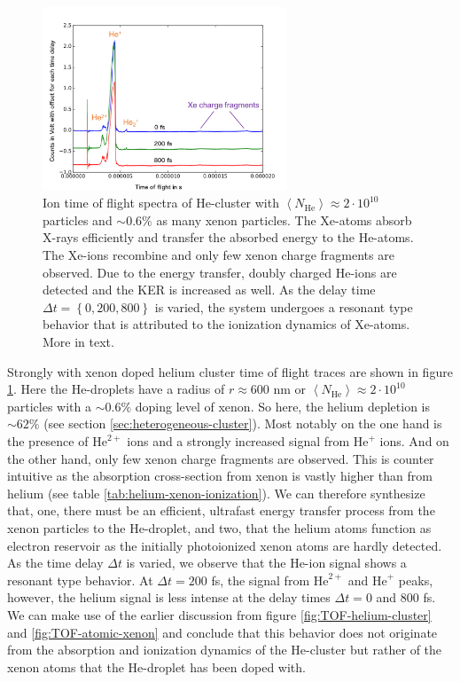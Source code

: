 \begin{figure}
	\centering
		\includegraphics[width=0.65\textwidth]{images/results/TOF-helium-xenon-cluster-60.png}
	\caption{Ion time of flight spectra of He-cluster with $\left\langle N_{\text{He}}\right\rangle\approx 2\cdot 10^{10}$ particles and $\sim 0.6\%$ as many xenon particles. The Xe-atoms absorb X-rays efficiently and transfer the absorbed energy to the He-atoms. The Xe-ions recombine and only few xenon charge fragments are observed. Due to the energy transfer, doubly charged He-ions are detected and the KER is increased as well. As the delay time $\Delta t=\left\{0,200,800\right\}$ is varied, the system undergoes a resonant type behavior that is attributed to the ionization dynamics of Xe-atoms. More in text.}
	\label{fig:TOF-helium-xenon-cluster-60}
\end{figure}
Strongly with xenon doped helium cluster time of flight traces are shown in figure \ref{fig:TOF-helium-xenon-cluster-60}. Here the He-droplets have a radius of $r\approx 600$ nm or $\left\langle N_{\text{He}}\right\rangle\approx 2\cdot 10^{10}$ particles with a $\sim 0.6\%$ doping level of xenon. So here, the helium depletion is $\sim 62\%$ (see section \ref{sec:heterogeneous-cluster}). Most notably on the one hand is the presence of $\text{He}^{2+}$ ions and a strongly increased signal from $\text{He}^{+}$ ions. And on the other hand, only few xenon charge fragments are observed. This is counter intuitive as the absorption cross-section from xenon is vastly higher than from helium (see table \ref{tab:helium-xenon-ionization}). We can therefore synthesize that, one, there must be an efficient, ultrafast energy transfer process from the xenon particles to the He-droplet, and two, that the helium atoms function as electron reservoir as the initially photoionized xenon atoms are hardly detected. As the time delay $\Delta t$ is varied, we observe that the He-ion signal shows a resonant type behavior. At $\Delta t = 200$ fs, the signal from $\text{He}^{2+}$ and $\text{He}^{+}$ peaks, however, the helium signal is less intense at the delay times $\Delta t = 0$ and 800 fs. We can make use of the earlier discussion from figure \ref{fig:TOF-helium-cluster} and \ref{fig:TOF-atomic-xenon} and conclude that this behavior does not originate from the absorption and ionization dynamics of the He-cluster but rather of the xenon atoms that the He-droplet has been doped with.\\
